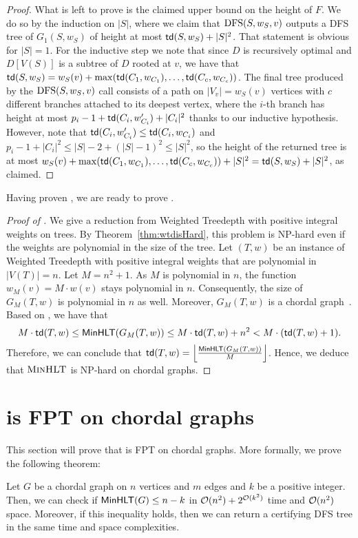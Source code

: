 \documentclass[a4paper,11pt]{article}
\begin{document}
\begin{proof}
What is left to prove is the claimed upper bound on the height of $F$. We do so by the induction on $|S|$, where we claim that $\mathrm{DFS}(S, w_S, v)$ outputs a DFS tree of $G_1(S, w_S)$ of height at most $\mathsf{td}(S, w_S) + |S|^2$. That statement is obvious for $|S|=1$. For the inductive step we note that since $D$ is recursively optimal and $D[V(S)]$ is a subtree of $D$ rooted at $v$, we have that $\mathsf{td}(S, w_S) = w_S(v) + \max(\mathsf{td}(C_1, w_{C_1}), \ldots, \mathsf{td}(C_c, w_{C_c}))$. 
The final tree produced by the $\mathrm{DFS}(S, w_S, v)$ call consists of a path on $|V_v| = w_S(v)$ vertices with $c$ different branches attached to its deepest vertex, where the $i$-th branch has height at most $p_i-1 + \mathsf{td}(C_i, w'_{C_i}) + |C_i|^2$ thanks to our inductive hypothesis. However, note that  $\mathsf{td}(C_i, w'_{C_i}) \le \mathsf{td}(C_i, w_{C_i})$ and $p_i-1 + |C_i|^2 \le |S|-2 + (|S|-1)^2 \le |S|^2$, so the height of the returned tree is at most $w_S(v) + \max(\mathsf{td}(C_1, w_{C_1}), \ldots, \mathsf{td}(C_c, w_{C_c})) + |S|^2 = \mathsf{td}(S, w_S) + |S|^2$, as claimed.
%
\end{proof}

Having proven , we are ready to prove .

\begin{proof}[Proof of ]
    We give a reduction from {\sc Weighted Treedepth} with positive integral weights on trees. By Theorem~\ref{thm:wtdisHard}, this problem is NP-hard even if the weights are polynomial in the size of the tree. 
    Let $(T,w)$ be an instance of {\sc Weighted Treedepth} with positive integral weights that are polynomial in $|V(T)|=n$. Let $M=n^2+1$. As $M$ is polynomial in $n$, the function $w_M(v) = M \cdot w(v)$ stays polynomial in $n$. Consequently, the size of $G_M(T, w)$ is polynomial in $n$ as well. Moreover, $G_M(T, w)$ is a chordal graph~\cite{ipl2006}. 
    Based on , we have that 
    $$M\cdot\mathsf{td}(T,w)\leq \mathsf{MinHLT}(G_M(T,w)) \leq M\cdot \mathsf{td}(T,w) + n^2 < M \cdot (\mathsf{td}(T, w) + 1).$$ 
    Therefore, we can conclude that $\mathsf{td}(T, w) = \left\lfloor{\frac{\mathsf{MinHLT}(G_M(T, w))}{M}}\right\rfloor$. Hence, we deduce that $\textsc{MinHLT}$ is NP-hard on chordal graphs.
\end{proof}

\section{\DualMinHProb is FPT on chordal graphs} \label{sectn:DualMinhlt}

This section will prove that \DualMinHProb is FPT on chordal graphs. More formally, we prove the following theorem:
%
\begin{theorem}\label{thm:fpt-chordal}
Let $G$ be a chordal graph on $n$ vertices and $m$ edges and $k$ be a positive integer. Then, we can check if $\mathsf{MinHLT}(G) \le n-k$ in ${\mathcal{O}}(n^2) + 2^{{\mathcal{O}}(k^2)}$ time and ${\mathcal{O}}(n^2)$ space. Moreover, if this inequality holds, then we can return a certifying DFS tree in the same time and space complexities.
\end{theorem}
\end{document}
